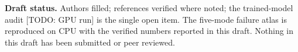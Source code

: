 \documentclass[journal]{IEEEtran}
\begin{document}
\vspace{1em}
\noindent\textbf{Draft status.} Authors filled; references verified where
noted; the trained-model audit [TODO: GPU run] is the single open item.
The five-mode failure atlas is reproduced on CPU with the verified numbers
reported in this draft. Nothing in this draft has been submitted or peer
reviewed.
\end{document}
